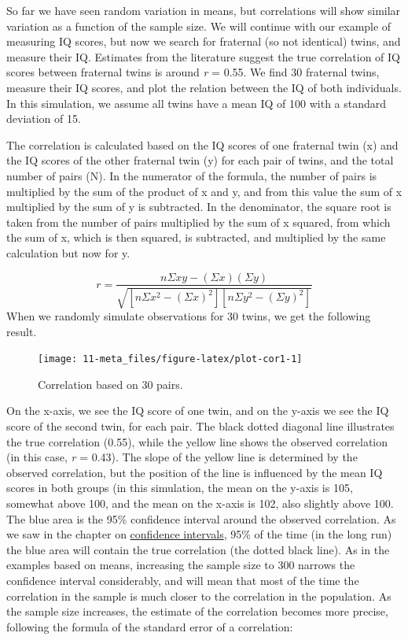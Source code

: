 \documentclass[
  oneside]{krantz}
\begin{document}
So far we have seen random variation in means, but correlations will show similar variation as a function of the sample size. We will continue with our example of measuring IQ scores, but now we search for fraternal (so not identical) twins, and measure their IQ. Estimates from the literature suggest the true correlation of IQ scores between fraternal twins is around \emph{r} = 0.55. We find 30 fraternal twins, measure their IQ scores, and plot the relation between the IQ of both individuals. In this simulation, we assume all twins have a mean IQ of 100 with a standard deviation of 15.

The correlation is calculated based on the IQ scores of one fraternal twin (x) and the IQ scores of the other fraternal twin (y) for each pair of twins, and the total number of pairs (N). In the numerator of the formula, the number of pairs is multiplied by the sum of the product of x and y, and from this value the sum of x multiplied by the sum of y is subtracted. In the denominator, the square root is taken from the number of pairs multiplied by the sum of x squared, from which the sum of x, which is then squared, is subtracted, and multiplied by the same calculation but now for y.

\[r=\frac{n \Sigma x y-(\Sigma x )(\Sigma y)}{\sqrt{[n \Sigma x^{2}-(\Sigma x)^{2}][n \Sigma y^{2}-(\Sigma y)^{2}]}}\]
When we randomly simulate observations for 30 twins, we get the following result.



\begin{figure}

{\centering \texttt{[image: 11-meta\_files/figure-latex/plot-cor1-1]} 

}

\caption{Correlation based on 30 pairs.}\label{fig:plot-cor1}
\end{figure}

On the x-axis, we see the IQ score of one twin, and on the y-axis we see the IQ score of the second twin, for each pair. The black dotted diagonal line illustrates the true correlation (0.55), while the yellow line shows the observed correlation (in this case, \emph{r} = 0.43). The slope of the yellow line is determined by the observed correlation, but the position of the line is influenced by the mean IQ scores in both groups (in this simulation, the mean on the y-axis is 105, somewhat above 100, and the mean on the x-axis is 102, also slightly above 100. The blue area is the 95\% confidence interval around the observed correlation. As we saw in the chapter on \protect\hyperlink{confint}{confidence intervals}, 95\% of the time (in the long run) the blue area will contain the true correlation (the dotted black line). As in the examples based on means, increasing the sample size to 300 narrows the confidence interval considerably, and will mean that most of the time the correlation in the sample is much closer to the correlation in the population. As the sample size increases, the estimate of the correlation becomes more precise, following the formula of the standard error of a correlation:
\end{document}
